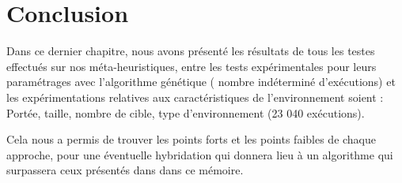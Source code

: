 \section{Conclusion}
Dans ce dernier chapitre, nous avons présenté les résultats de tous les testes effectués sur nos méta-heuristiques, entre les tests expérimentales pour leurs paramétrages avec l'algorithme génétique ( nombre indéterminé d'exécutions) et les expérimentations relatives aux caractéristiques de l'environnement soient : Portée, taille, nombre de cible, type d'environnement (23 040 exécutions).

Cela nous a permis de trouver les points forts et les points faibles de chaque approche, pour une éventuelle hybridation qui donnera lieu à un algorithme qui surpassera ceux présentés dans dans ce mémoire.\\


